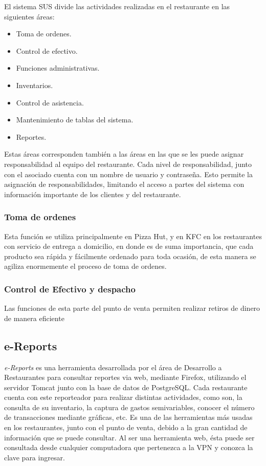 El sistema SUS divide las actividades realizadas en el restaurante en las siguientes áreas:

\begin{itemize}
 \item Toma de ordenes.
 \item Control de efectivo.
 \item Funciones administrativas.
 \item Inventarios.
 \item Control de asistencia.
 \item Mantenimiento de tablas del sistema.
 \item Reportes.
\end{itemize}

Estas áreas corresponden también a las áreas en las que se les puede asignar responsabilidad al equipo del restaurante. Cada nivel de responsabilidad, junto con el asociado cuenta con un nombre de usuario y contraseña. Esto permite la asignación de responsabilidades, limitando el acceso a partes del sistema con información importante de los clientes y del restaurante.

\subsubsection{Toma de ordenes}
\label{sec:sus_toma_ordenes}

Esta función se utiliza principalmente en Pizza Hut, y en KFC en los restaurantes con servicio de entrega a domicilio, en donde es de suma importancia, que cada producto sea rápida y fácilmente ordenado para toda ocasión, de esta manera se agiliza enormemente el proceso de toma de ordenes.

\subsubsection{Control de Efectivo y despacho}
\label{sec:sus_control_efectivo}

Las funciones de esta parte del punto de venta permiten realizar retiros de dinero de manera eficiente 

\subsection{e-Reports}
\label{sec:ereports}

\textit{e-Reports} es una herramienta desarrollada por el área de Desarrollo a Restaurantes para consultar reportes via web, mediante Firefox, utilizando el servidor Tomcat junto con la base de datos de PostgreSQL. Cada restaurante cuenta con este reporteador para realizar distintas actividades, como son, la consulta de su inventario, la captura de gastos semivariables, conocer el número de transacciones mediante gráficas, etc. Es una de las herramientas más usadas en los restaurantes, junto con el punto de venta, debido a la gran cantidad de información que se puede consultar. Al ser una herramienta web, ésta puede ser consultada desde cualquier computadora que pertenezca a la VPN y conozca la clave para ingresar.

